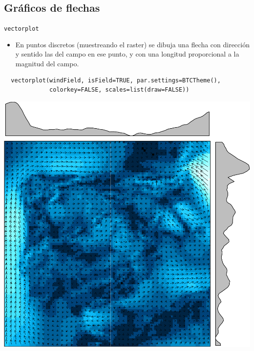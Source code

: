 \documentclass[xcolor={usenames,svgnames,dvipsnames}]{beamer}
\begin{document}
\subsection{Gráficos de flechas}
\label{sec-5-2}
\begin{frame}[fragile,label=sec-5-2-1]{\texttt{vectorplot}}
 \begin{itemize}
\item En puntos discretos (muestreando el raster) se dibuja una flecha con dirección y sentido las del campo en ese punto, y con una longitud proporcional a la magnitud del campo.
\end{itemize}

\lstset{language=R,label= ,caption= ,numbers=none}
\begin{lstlisting}
  vectorplot(windField, isField=TRUE, par.settings=BTCTheme(),
             colorkey=FALSE, scales=list(draw=FALSE))
\end{lstlisting}
\end{frame}

\begin{frame}[label=sec-5-2-2]{}
\includegraphics[width=.9\linewidth]{figs/vectorplot.pdf}
\end{frame}
\end{document}
